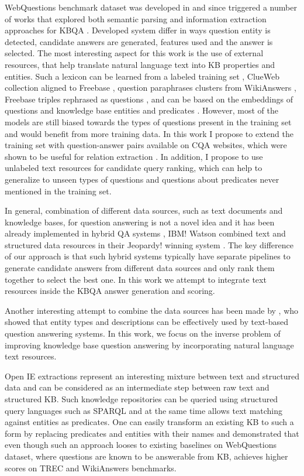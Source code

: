 WebQuestions benchmark dataset was developed in \cite{Berant:EMNLP13} and since triggered a number of works that explored both semantic parsing and information extraction approaches for KBQA \cite{yao2014freebase}.
Developed system differ in ways question entity is detected, candidate answers are generated, features used and the answer is selected.
The most interesting aspect for this work is the use of external resources, that help translate natural language text into KB properties and entities.
Such a lexicon can be learned from a labeled training set \cite{Berant:EMNLP13},  ClueWeb collection aligned to Freebase \cite{yao2014information}, question paraphrases clusters from WikiAnswers \cite{berant2014semantic}, Freebase triples rephrased as questions \cite{BordesCW14:emnlp}, and can be based on the embeddings of questions and knowledge base entities and predicates \cite{BordesCW14:emnlp,yih2015semantic}.
However, most of the models are still biased towards the types of questions present in the training set and would benefit from more training data.
In this work I propose to extend the training set with question-answer pairs available on CQA websites, which were shown to be useful for relation extraction \cite{savenkov-EtAl:2015:SRW}.
In addition, I propose to use unlabeled text resources for candidate query ranking, which can help to generalize to unseen types of questions and questions about predicates never mentioned in the training set.

In general, combination of different data sources, such as text documents and knowledge bases, for question answering is not a novel idea and it has been already implemented in hybrid QA systems \cite{baudivs2015modeling}, \eg IBM! Watson combined text and structured data resources in their Jeopardy! winning system \cite{Barker12}.
The key difference of our approach is that such hybrid systems typically have separate pipelines to generate candidate answers from different data sources and only rank them together to select the best one.
In this work we attempt to integrate text resources inside the KBQA answer generation and scoring.

Another interesting attempt to combine the data sources has been made by  \cite{Sun:2015:ODQ:2736277.2741651}, who showed that entity types and descriptions can be effectively used by text-based question answering systems.
In this work, we focus on the inverse problem of improving knowledge base question answering by incorporating natural language text resources.

Open IE extractions \cite{fader2011identifying} represent an interesting mixture between text and structured data and can be considered as an intermediate step between raw text and structured KB.
Such knowledge repositories can be queried using structured query languages such as SPARQL and at the same time allows text matching against entities as predicates.
One can easily transform an existing KB to such a form by replacing predicates and entities with their names and  \cite{Fader:2014:OQA:2623330.2623677} demonstrated that even though such an approach looses to existing baselines on WebQuestions dataset, where questions are known to be answerable from KB, achieves higher scores on TREC and WikiAnswers benchmarks.
